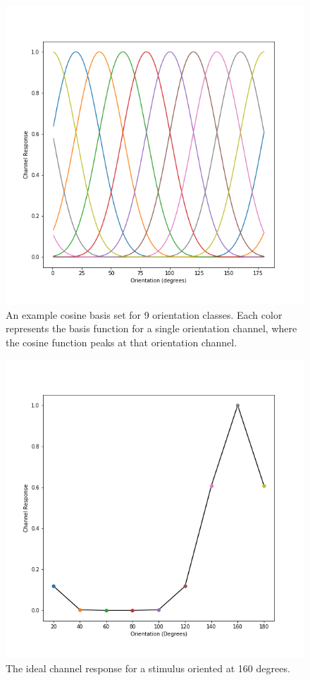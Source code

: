 \documentclass[../main.tex]{subfiles}
\begin{document}
\begin{figure}
    \centering
    \includegraphics[scale=0.7]{figures/methods/basis_set.png}
    \caption{An example cosine basis set for 9 orientation classes. Each color represents the
    basis function for a single orientation channel, where the cosine function peaks at that
    orientation channel.}
    \label{basis_set}
\end{figure}

\begin{figure}
    \centering
    \includegraphics[scale=0.7]{figures/methods/ideal_chan_resp.png}
    \caption{The ideal channel response for a stimulus oriented at 160 degrees.}
    \label{ideal_chan_resp}
\end{figure}
\end{document}
